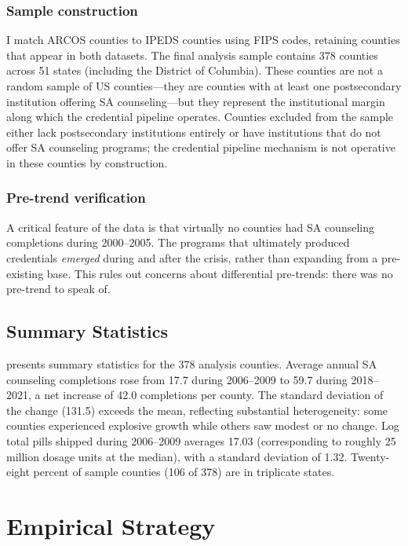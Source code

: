 \documentclass[12pt]{article}
\begin{document}
\subsubsection*{Sample construction} I match ARCOS counties to IPEDS counties using FIPS codes, retaining counties that appear in both datasets. The final analysis sample contains 378 counties across 51 states (including the District of Columbia). These counties are not a random sample of US counties---they are counties with at least one postsecondary institution offering SA counseling---but they represent the institutional margin along which the credential pipeline operates. Counties excluded from the sample either lack postsecondary institutions entirely or have institutions that do not offer SA counseling programs; the credential pipeline mechanism is not operative in these counties by construction.

\subsubsection*{Pre-trend verification} A critical feature of the data is that virtually no counties had SA counseling completions during 2000--2005. The programs that ultimately produced credentials \textit{emerged} during and after the crisis, rather than expanding from a pre-existing base. This rules out concerns about differential pre-trends: there was no pre-trend to speak of.

\subsection{Summary Statistics}

 presents summary statistics for the 378 analysis counties. Average annual SA counseling completions rose from 17.7 during 2006--2009 to 59.7 during 2018--2021, a net increase of 42.0 completions per county. The standard deviation of the change (131.5) exceeds the mean, reflecting substantial heterogeneity: some counties experienced explosive growth while others saw modest or no change. Log total pills shipped during 2006--2009 averages 17.03 (corresponding to roughly 25 million dosage units at the median), with a standard deviation of 1.32. Twenty-eight percent of sample counties (106 of 378) are in triplicate states.




\section{Empirical Strategy}
\end{document}
